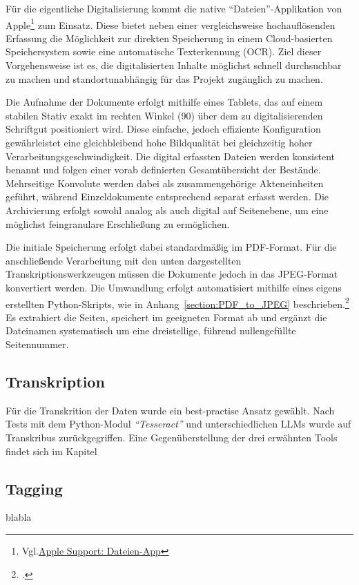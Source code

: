 \documentclass[12pt, a4paper, ngerman, bidi=default]{article}
\let\cite\footcite
\begin{document}
Für die eigentliche Digitalisierung kommt die native \enquote{Dateien}-Applikation von 
Apple\footnote{Vgl.\href{https://support.apple.com/de-de/guide/preview/prvw28034/mac}{Apple Support: Dateien-App}} zum Einsatz. 
Diese bietet neben einer vergleichsweise hochauflösenden Erfassung die Möglichkeit zur direkten Speicherung in einem Cloud-basierten 
Speichersystem sowie eine automatische Texterkennung (OCR). Ziel dieser Vorgehensweise ist es, die digitalisierten Inhalte möglichst 
schnell durchsuchbar zu machen und standortunabhängig für das Projekt zugänglich zu machen.

Die Aufnahme der Dokumente erfolgt mithilfe eines Tablets, das auf einem stabilen Stativ exakt im rechten Winkel (90\textdegree)
über dem zu digitalisierenden Schriftgut positioniert wird. Diese einfache, jedoch effiziente Konfiguration gewährleistet eine 
gleichbleibend hohe Bildqualität bei gleichzeitig hoher Verarbeitungsgeschwindigkeit. Die digital erfassten Dateien werden konsistent
 benannt und folgen einer vorab definierten Gesamtübersicht der Bestände. Mehrseitige Konvolute werden dabei als zusammengehörige 
 Akteneinheiten geführt, während Einzeldokumente entsprechend separat erfasst werden. Die Archivierung erfolgt sowohl analog als auch 
 digital auf Seitenebene, um eine möglichst feingranulare Erschließung zu ermöglichen.

Die initiale Speicherung erfolgt dabei standardmäßig im PDF-Format. Für die anschließende Verarbeitung mit den unten dargestellten 
Transkriptionswerkzeugen müssen die Dokumente jedoch in das JPEG-Format konvertiert werden. Die Umwandlung erfolgt automatisiert 
mithilfe eines eigens erstellten Python-Skripts, wie in Anhang~\ref{section:PDF_to_JPEG} beschrieben.\cite{burkhardt_githubpdf_to_jpegpy_2025}
Es extrahiert die Seiten, speichert im geeigneten 
Format ab und ergänzt die Dateinamen systematisch um eine dreistellige, führend nullengefüllte Seitennummer.

\subsection{Transkription}
Für die Transkrition der Daten wurde ein best-practise Ansatz gewählt. Nach Tests mit dem Python-Modul \textit{\enquote{Tesseract}} 
und unterschiedlichen LLMs wurde auf Transkribus zurückgegriffen. Eine Gegenüberstellung der drei erwähnten Tools findet 
sich im Kapitel~

\subsection{Tagging}
blabla
\end{document}
